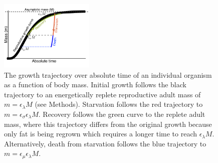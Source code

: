 \documentclass[twocolumn,preprintnumbers,amsmath,amssymb,superscriptaddress]{revtex4}
\begin{document}

\begin{figure}
\centering
\includegraphics[width=0.4\textwidth]{Growth-trajectory-diagram.pdf}
\caption{\small{ The growth trajectory over absolute time of an individual organism as a function of body mass.  
Initial growth follows the black trajectory to an energetically replete reproductive adult mass of $m=\epsilon_\lambda M$ (see Methods). %
Starvation follows the red trajectory to $m = \epsilon_\sigma \epsilon_\lambda  M$. 
Recovery follows the green curve to the replete adult mass, where this trajectory differs from the original growth because only fat is being regrown which requires a longer time to reach $\epsilon_\lambda M$. %
Alternatively, death from starvation follows the blue trajectory to $m=\epsilon_\mu \epsilon_\lambda  M$.}\label{fig:growth}}
\end{figure}
\end{document}
